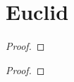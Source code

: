 \section{Euclid}


\begin{definition}
\end{definition}


\begin{theorem}
    \begin{proof}
    \end{proof}
\end{theorem}


\begin{theorem}
    \begin{proof}
    \end{proof}
\end{theorem}


\begin{definition}[$\pi(x)$]
\end{definition}
